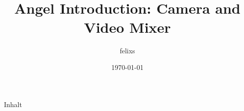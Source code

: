 \documentclass[aspectratio=169]{beamer}
\title{Angel Introduction: Camera and Video Mixer}
\date{\today \currenttime}
\author{felixs}
\institute{C3VOC}
\begin{document}

\maketitle

\begin{frame}{Inhalt}
\tableofcontents
\end{frame}


\newpage









%














\end{document}
